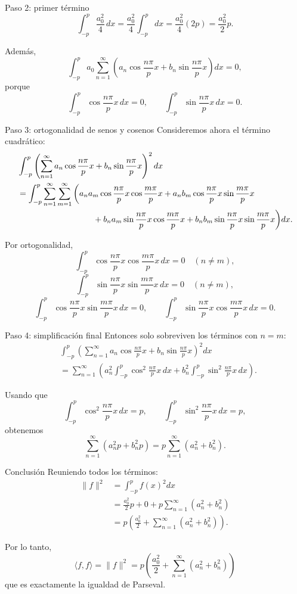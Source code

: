 \documentclass[10pt]{beamer}
\begin{document}
\begin{frame}{Paso 2: primer término}
\[
\int_{-p}^{p} \frac{a_0^2}{4}\,dx
= \frac{a_0^2}{4}\int_{-p}^{p}dx
= \frac{a_0^2}{4}(2p)
= \frac{a_0^2}{2}p.
\]

Además,
\[
\int_{-p}^{p} a_0\sum_{n=1}^{\infty}\left(a_n\cos\frac{n\pi}{p}x+b_n\sin\frac{n\pi}{p}x\right)dx = 0,
\]
porque
\[
\int_{-p}^{p} \cos\frac{n\pi}{p}x\,dx = 0,
\qquad
\int_{-p}^{p} \sin\frac{n\pi}{p}x\,dx = 0.
\]
\end{frame}

\begin{frame}{Paso 3: ortogonalidad de senos y cosenos}
Consideremos ahora el término cuadrático:
\[
\begin{aligned}
&\int_{-p}^{p}\left(\sum_{n=1}^{\infty} a_n\cos\frac{n\pi}{p}x + b_n\sin\frac{n\pi}{p}x\right)^2dx \\
&= \int_{-p}^{p}\sum_{n=1}^{\infty}\sum_{m=1}^{\infty}\bigg(
  a_n a_m \cos\frac{n\pi}{p}x\cos\frac{m\pi}{p}x
  + a_n b_m \cos\frac{n\pi}{p}x\sin\frac{m\pi}{p}x \\
&\hspace{3.2cm}+ b_n a_m \sin\frac{n\pi}{p}x\cos\frac{m\pi}{p}x
  + b_n b_m \sin\frac{n\pi}{p}x\sin\frac{m\pi}{p}x\bigg)dx.
\end{aligned}
\]

Por ortogonalidad,
\[
\int_{-p}^{p}\cos\frac{n\pi}{p}x\cos\frac{m\pi}{p}x\,dx = 0 \quad (n\neq m),
\]
\[
\int_{-p}^{p}\sin\frac{n\pi}{p}x\sin\frac{m\pi}{p}x\,dx = 0 \quad (n\neq m),
\]
\[
\int_{-p}^{p}\cos\frac{n\pi}{p}x\sin\frac{m\pi}{p}x\,dx = 0,
\qquad
\int_{-p}^{p}\sin\frac{n\pi}{p}x\cos\frac{m\pi}{p}x\,dx = 0.
\]
\end{frame}

\begin{frame}{Paso 4: simplificación final}
Entonces solo sobreviven los términos con $n=m$:
\[
\begin{aligned}
&\int_{-p}^{p}\left(\sum_{n=1}^{\infty} a_n\cos\frac{n\pi}{p}x + b_n\sin\frac{n\pi}{p}x\right)^2dx \\
&= \sum_{n=1}^{\infty}\left(a_n^2\int_{-p}^{p}\cos^2\frac{n\pi}{p}x\,dx + b_n^2\int_{-p}^{p}\sin^2\frac{n\pi}{p}x\,dx\right).
\end{aligned}
\]

Usando que
\[
\int_{-p}^{p}\cos^2\frac{n\pi}{p}x\,dx = p,
\qquad
\int_{-p}^{p}\sin^2\frac{n\pi}{p}x\,dx = p,
\]
obtenemos
\[
\sum_{n=1}^{\infty}\left(a_n^2p+b_n^2p\right)=p\sum_{n=1}^{\infty}(a_n^2+b_n^2).
\]
\end{frame}

\begin{frame}{Conclusión}
Reuniendo todos los términos:
\[
\begin{aligned}
\|f\|^2 &= \int_{-p}^{p} f(x)^2dx \\
&= \frac{a_0^2}{2}p + 0 + p\sum_{n=1}^{\infty}(a_n^2+b_n^2) \\
&= p\left(\frac{a_0^2}{2} + \sum_{n=1}^{\infty}(a_n^2+b_n^2)\right).
\end{aligned}
\]

Por lo tanto,
\[
\boxed{\langle f,f\rangle = \|f\|^2 = p\left(\frac{a_0^2}{2} + \sum_{n=1}^{\infty}(a_n^2+b_n^2)\right)}
\]
que es exactamente la igualdad de Parseval.
\end{frame}
\end{document}
